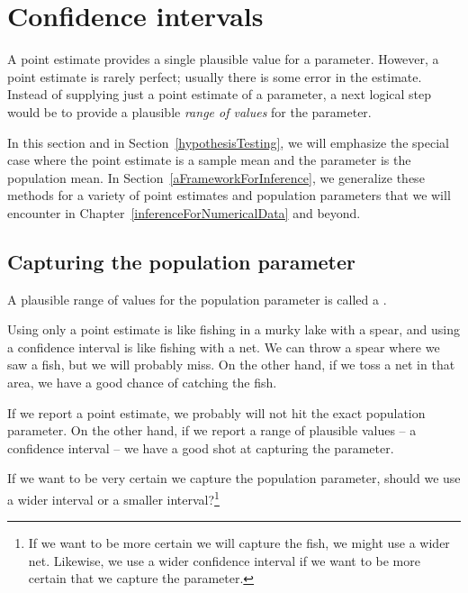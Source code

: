 

\section{Confidence intervals}
\label{confidenceIntervals}


A point estimate provides a single plausible value for a parameter. However, a point estimate is rarely perfect; usually there is some error in the estimate. Instead of supplying just a point estimate of a parameter, a next logical step would be to provide a plausible \emph{range of values} for the parameter.

In this section and in Section~\ref{hypothesisTesting}, we will emphasize the special case where the point estimate is a sample mean and the parameter is the population mean. In Section~\ref{aFrameworkForInference}, we generalize these methods for a variety of point estimates and population parameters that we will encounter in Chapter~\ref{inferenceForNumericalData} and beyond.

\subsection{Capturing the population parameter}

A plausible range of values for the population parameter is called a .

Using only a point estimate is like fishing in a murky lake with a spear, and using a confidence interval is like fishing with a net. We can throw a spear where we saw a fish, but we will probably miss. On the other hand, if we toss a net in that area, we have a good chance of catching the fish.

If we report a point estimate, we probably will not hit the exact population parameter. On the other hand, if we report a range of plausible values -- a confidence interval -- we have a good shot at capturing the parameter. 

\begin{exercise}
If we want to be very certain we capture the population parameter, should we use a wider interval or a smaller interval?\footnote{If we want to be more certain we will capture the fish, we might use a wider net. Likewise, we use a wider confidence interval if we want to be more certain that we capture the parameter.}
\end{exercise}

